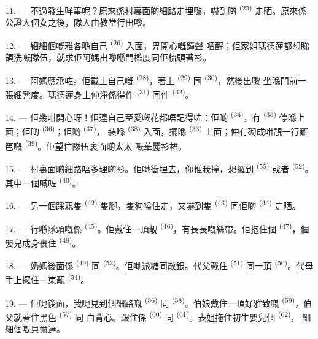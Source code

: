 11. --- 不過發生咩事呢？原來係村裏面啲細路走埋嚟，嚇到啲
\textsuperscript{(25)} 走晒。原來係公證人個女之後，隊人由教堂行出嚟。

12. --- 細細個嘅雅各喺自己 \textsuperscript{(26)} 入面，畀開心嘅鐘聲
嘈醒；佢家姐瑪德蓮都想睇領洗嘅隊伍，就求佢阿媽出嚟喺門檻度同佢梳頭著衫。

13. --- 阿媽應承咗。佢戴上自己嘅 \textsuperscript{(28)}，著上
 \textsuperscript{(29)} 同 \textsuperscript{(30)}，然後出嚟
坐喺門前一張細凳度。瑪德蓮身上仲淨係得件 \textsuperscript{(31)} 同件
 \textsuperscript{(32)}。

14. --- 佢幾咁開心呀！佢連自己至愛嘅花都唔記得咗：佢啲
\textsuperscript{(34)}，有 \textsuperscript{(35)} 停喺上面；佢啲
 \textsuperscript{(36)}；佢啲 \textsuperscript{(37)}，
裝喺 \textsuperscript{(38)} 入面，擺喺 \textsuperscript{(33)}
上面；仲有砌成咁靚一行籬笆嘅 \textsuperscript{(39)}。佢望住隊伍裏面啲太太
嘅華麗衫裙。

15. --- 村裏面啲細路唔多理啲衫。佢哋衝埋去，你推我撞，想攞到
\textsuperscript{(55)} 或者 \textsuperscript{(52)}。其中一個喊咗
\textsuperscript{(40)}。

16. --- 另一個踩親隻 \textsuperscript{(42)} 隻腳，隻狗嗌住走，又嚇到隻
 \textsuperscript{(43)} 同佢啲 \textsuperscript{(44)} 走晒。

\VUsaut{5.0mm}
\VUsaut{4.0mm}

17. --- 行喺隊頭嘅係 \textsuperscript{(45)}。佢戴住一頂靚
 \textsuperscript{(46)}，有長長嘅絲帶。佢抱住個
\textsuperscript{(47)}，個嬰兒成身裹住 \textsuperscript{(48)}。

18. --- 奶媽後面係 \textsuperscript{(49)} 同
\textsuperscript{(53)}。佢哋派糖同散銀。代父戴住 \textsuperscript{(51)}
同一頂 \textsuperscript{(50)}。代母手上攞住一束靚
\textsuperscript{(54)}。

19. --- 佢哋後面，我哋見到個細路嘅 \textsuperscript{(56)} 同
 \textsuperscript{(58)}。伯娘戴住一頂好雅致嘅
\textsuperscript{(59)}，伯父就著住黑色 \textsuperscript{(57)} 同
白背心。跟住係 \textsuperscript{(60)} 同
\textsuperscript{(61)}。表姐拖住初生嬰兒個 \textsuperscript{(62)}，
細細個嘅貝爾達。

